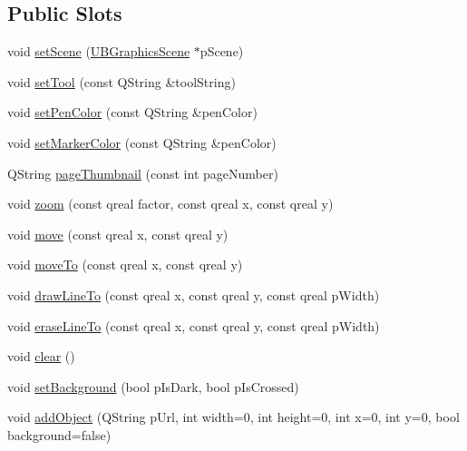 \subsection*{Public Slots}
\begin{DoxyCompactItemize}
\item 
void \hyperlink{class_u_b_widget_uniboard_a_p_i_a361224a62cb8c3c4caba4cc1dd4fef6d}{set\-Scene} (\hyperlink{class_u_b_graphics_scene}{U\-B\-Graphics\-Scene} $\ast$p\-Scene)
\item 
void \hyperlink{class_u_b_widget_uniboard_a_p_i_a604a13d819109e92582be7da921cfae3}{set\-Tool} (const Q\-String \&tool\-String)
\item 
void \hyperlink{class_u_b_widget_uniboard_a_p_i_a14d16c4c2e1e817d2dcbf435cac487d5}{set\-Pen\-Color} (const Q\-String \&pen\-Color)
\item 
void \hyperlink{class_u_b_widget_uniboard_a_p_i_a187ba2eec4390879bff5cbafa4f42046}{set\-Marker\-Color} (const Q\-String \&pen\-Color)
\item 
Q\-String \hyperlink{class_u_b_widget_uniboard_a_p_i_a271e5811f036be68281a1384aabd382e}{page\-Thumbnail} (const int page\-Number)
\item 
void \hyperlink{class_u_b_widget_uniboard_a_p_i_af20ee99e10a36cc9c576242c0ac97a23}{zoom} (const qreal factor, const qreal x, const qreal y)
\item 
void \hyperlink{class_u_b_widget_uniboard_a_p_i_ab2f0322191a207b1580b1f494c597861}{move} (const qreal x, const qreal y)
\item 
void \hyperlink{class_u_b_widget_uniboard_a_p_i_a40e020502cd9f4d9ab7bb676e90dfb3f}{move\-To} (const qreal x, const qreal y)
\item 
void \hyperlink{class_u_b_widget_uniboard_a_p_i_aa327e2c043d24aa262dce1e889fe0336}{draw\-Line\-To} (const qreal x, const qreal y, const qreal p\-Width)
\item 
void \hyperlink{class_u_b_widget_uniboard_a_p_i_a44319957dc9d0919015f73826998f0ee}{erase\-Line\-To} (const qreal x, const qreal y, const qreal p\-Width)
\item 
void \hyperlink{class_u_b_widget_uniboard_a_p_i_a4c4dd082d6ed9397e4658a41f78638f5}{clear} ()
\item 
void \hyperlink{class_u_b_widget_uniboard_a_p_i_a62c626fae4d23f4dc53a9e8b3b11a589}{set\-Background} (bool p\-Is\-Dark, bool p\-Is\-Crossed)
\item 
void \hyperlink{class_u_b_widget_uniboard_a_p_i_a73ac1600ef3ed549d2c6c969436efb2f}{add\-Object} (Q\-String p\-Url, int width=0, int height=0, int x=0, int y=0, bool background=false)

\end{DoxyCompactItemize}
